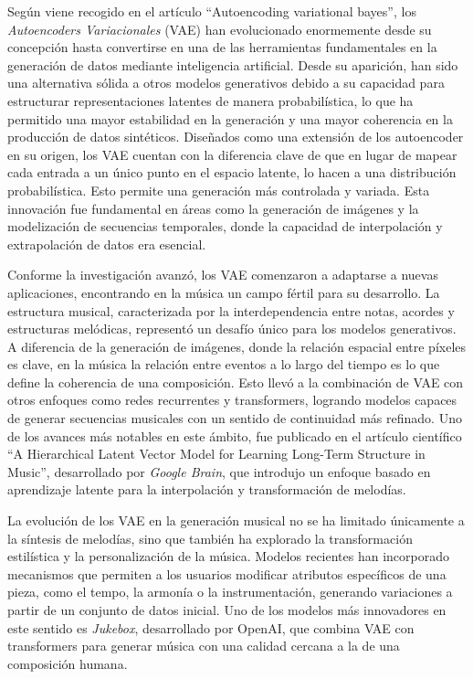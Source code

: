 Según viene recogido en el artículo ``Autoencoding variational bayes''\citep{kingma2013vae}, los \emph{Autoencoders Variacionales} (VAE) han evolucionado enormemente desde su concepción hasta convertirse en una de las herramientas fundamentales en la generación de datos mediante inteligencia artificial. Desde su aparición, han sido una alternativa sólida a otros modelos generativos debido a su capacidad para estructurar representaciones latentes de manera probabilística, lo que ha permitido una mayor estabilidad en la generación y una mayor coherencia en la producción de datos sintéticos. Diseñados como una extensión de los autoencoder en su origen, los VAE cuentan con la diferencia clave de que en lugar de mapear cada entrada a un único punto en el espacio latente, lo hacen a una distribución probabilística. Esto permite una generación más controlada y variada. Esta innovación fue fundamental en áreas como la generación de imágenes y la modelización de secuencias temporales, donde la capacidad de interpolación y extrapolación de datos era esencial.

Conforme la investigación avanzó, los VAE comenzaron a adaptarse a nuevas aplicaciones, encontrando en la música un campo fértil para su desarrollo. La estructura musical, caracterizada por la interdependencia entre notas, acordes y estructuras melódicas, representó un desafío único para los modelos generativos. A diferencia de la generación de imágenes, donde la relación espacial entre píxeles es clave, en la música la relación entre eventos a lo largo del tiempo es lo que define la coherencia de una composición. Esto llevó a la combinación de VAE con otros enfoques como redes recurrentes y transformers, logrando modelos capaces de generar secuencias musicales con un sentido de continuidad más refinado. Uno de los avances más notables en este ámbito, fue publicado en el artículo científico ``A Hierarchical Latent Vector Model for Learning Long-Term Structure in Music''\citep{roberts2018musicvae}, desarrollado por \emph{Google Brain}, que introdujo un enfoque basado en aprendizaje latente para la interpolación y transformación de melodías.

La evolución de los VAE en la generación musical no se ha limitado únicamente a la síntesis de melodías, sino que también ha explorado la transformación estilística y la personalización de la música. Modelos recientes han incorporado mecanismos que permiten a los usuarios modificar atributos específicos de una pieza, como el tempo, la armonía o la instrumentación, generando variaciones a partir de un conjunto de datos inicial. Uno de los modelos más innovadores en este sentido es \emph{Jukebox}, desarrollado por OpenAI, que combina VAE con transformers para generar música con una calidad cercana a la de una composición humana.

